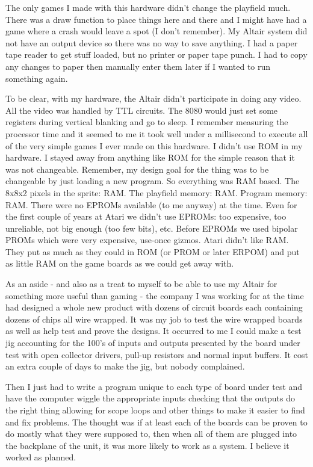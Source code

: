The only games I made with this hardware didn't change the playfield much. There was a draw function to place things here and there and I might have had a game where a crash would leave a spot (I don't remember). My Altair system did not have an output device so there was no way to save anything. I had a paper tape reader to get stuff loaded, but no printer or paper tape punch. I had to copy any changes to paper then manually enter them later if I wanted to run something again. 

To be clear, with my hardware, the Altair didn't participate in doing any video. All the video was handled by TTL circuits. The 8080 would just set some registers during vertical blanking and go to sleep. I remember measuring the processor time and it seemed to me it took well under a millisecond to execute all of the very simple games I ever made on this hardware.
I didn’t use ROM in my hardware. I stayed away from anything like ROM for the simple reason that it was not changeable. Remember, my design goal for the thing was to be changeable by just loading a new program. So everything was RAM based. The 8x8x2 pixels in the sprite: RAM. The playfield memory: RAM. Program memory: RAM. 
There were no EPROMs available (to me anyway) at the time. Even for the first couple of years at Atari we didn't use EPROMs: too expensive, too unreliable, not big enough (too few bits), etc. Before EPROMs we used bipolar PROMs which were very expensive, use-once gizmos. Atari didn't like RAM. They put as much as they could in ROM (or PROM or later ERPOM) and put as little RAM on the game boards as we could get away with.

As an aside - and also as a treat to myself to be able to use my Altair for something more useful than gaming - the company I was working for at the time had designed a whole new product with dozens of circuit boards each containing dozens of chips all wire wrapped. It was my job to test the wire wrapped boards as well as help test and prove the designs. It occurred to me I could make a test jig accounting for the 100's of inputs and outputs presented by the board under test with open collector drivers, pull-up resistors and normal input buffers. It cost an extra couple of days to make the jig, but nobody complained. 

Then I just had to write a program unique to each type of board under test and have the computer wiggle the appropriate inputs checking that the outputs do the right thing allowing for scope loops and other things to make it easier to find and fix problems. The thought was if at least each of the boards can be proven to do mostly what they were supposed to, then when all of them are plugged into the backplane of the unit, it was more likely to work as a system. I believe it worked as planned.

